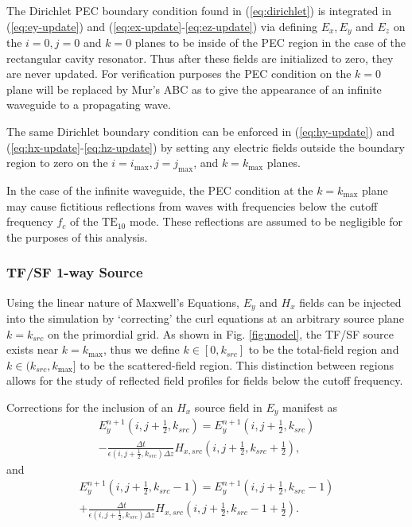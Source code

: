 The Dirichlet PEC boundary condition found in (\ref{eq:dirichlet}) is integrated in (\ref{eq:ey-update}) and (\ref{eq:ex-update}-\ref{eq:ez-update}) via defining $E_x, E_y$ and $E_z$ on the $i=0, j=0$ and $k=0$ planes to be inside of the PEC region in the case of the rectangular cavity resonator. Thus after these fields are initialized to zero, they are never updated. For verification purposes the PEC condition on the $k=0$ plane will be replaced by Mur's ABC as to give the appearance of an infinite waveguide to a propagating wave.

The same Dirichlet boundary condition can be enforced in  (\ref{eq:hy-update}) and (\ref{eq:hx-update}-\ref{eq:hz-update}) by setting any electric fields outside the boundary region to zero on the $i=i_{\max}, j=j_{\max}$, and $k=k_{\max}$ planes. 

In the case of the infinite waveguide, the PEC condition at the $k=k_{\max}$ plane may cause fictitious reflections from waves with frequencies below the cutoff frequency $f_c$ of the $\mathrm{TE_{10}}$ mode. These reflections are assumed to be negligible for the purposes of this analysis.  

\subsubsection{TF/SF 1-way Source}
\label{subsubsec:tfsf-timestep}
Using the linear nature of Maxwell's Equations, $E_y$ and $H_x$ fields can be injected into the simulation by `correcting' the curl equations at an arbitrary source plane $k=k_{src}$ on the primordial grid. As shown in Fig. \ref{fig:model}, the TF/SF source exists near $k=k_{\max}$, thus we define $k\in[0,k_{src}]$ to be the total-field region and $k\in(k_{src},k_{\max}]$ to be the scattered-field region. This distinction between regions allows for the study of reflected field profiles for fields below the cutoff frequency.

Corrections for the inclusion of an $H_x$ source field in $E_y$ manifest as
\begin{multline}
	E_y^{n+1}(i,j+\tfrac{1}{2},k_{src}) = E_y^{n+1}(i,j+\tfrac{1}{2},k_{src}) \\ - \frac{\Delta t}{\epsilon(i,j+\tfrac{1}{2},k_{src})\Delta z}H_{x,src}(i,j+\tfrac{1}{2},k_{src}+\tfrac{1}{2}),
\end{multline}
and
\begin{multline}
	E_y^{n+1}(i,j+\tfrac{1}{2},k_{src}-1) = E_y^{n+1}(i,j+\tfrac{1}{2},k_{src}-1) \\ + \frac{\Delta t}{\epsilon(i,j+\tfrac{1}{2},k_{src})\Delta z}H_{x,src}(i,j+\tfrac{1}{2},k_{src}-1+\tfrac{1}{2}).
\end{multline}

